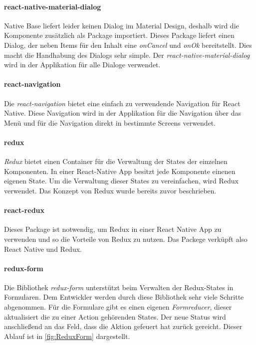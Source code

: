 \paragraph{react-native-material-dialog}
Native Base liefert leider keinen Dialog im Material Design, deshalb wird die Komponente zusätzlich als Package
importiert. Dieses Package liefert einen Dialog, der neben Items für den Inhalt eine \textit{onCancel} und
\textit{onOk} bereitstellt. Dies macht die Handhabung des Dialogs sehr simple. Der \textit{react-native-material-dialog}
wird in der Applikation für alle Dialoge verwendet.
\cite{MaterialDialog:online}

\paragraph{react-navigation}
Die \textit{react-navigation} bietet eine einfach zu verwendende Navigation für React Native.
Diese Navigation wird in der Applikation für die Navigation über das Menü und für die Navigation
direkt in bestimmte Screens verwendet. \cite{ReactNavigation:online}

\paragraph{redux}
\textit{Redux} bietet einen Container für die Verwaltung der States der einzelnen Komponenten.
In einer React-Native App besitzt jede Komponente einenen eigenen State. Um die Verwaltung dieser
States zu vereinfachen, wird Redux verwendet. Das Konzept von Redux wurde bereits zuvor beschrieben.
\cite{Redux:online}

\paragraph{react-redux}
Dieses Package ist notwendig, um Redux in einer React Native App zu verwenden und so die Vorteile von
Redux zu nutzen. Das Packege verküpft also React Native und Redux.
\cite{ReactRedux:online}

\paragraph{redux-form}
Die Bibliothek \textit{redux-form} unterstützt beim Verwalten der Redux-States in Formularen.
Dem Entwickler werden durch diese Bibliothek sehr viele Schritte abgenommen. Für die Formulare
gibt es einen eigenen \textit{Formreducer}, dieser aktualisiert die zu einer Action gehörenden States.
Der neue Status wird anschließend an das Feld, dass die Aktion gefeuert hat zurück gereicht. Dieser
Ablauf ist in \autoref{fig:ReduxForm} dargestellt. \cite{ReduxForm:online}

